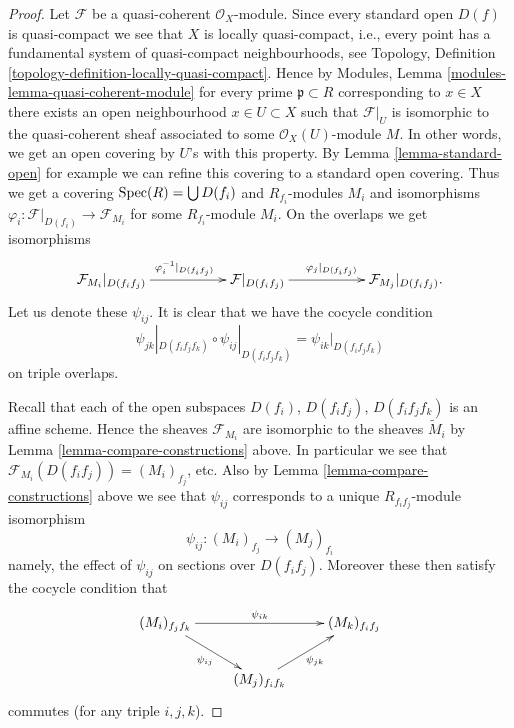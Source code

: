 \begin{proof}
Let $\mathcal{F}$ be a quasi-coherent $\mathcal{O}_X$-module.
Since every standard open $D(f)$ is quasi-compact we see that
$X$ is locally quasi-compact, i.e., every point has a fundamental
system of quasi-compact neighbourhoods, see Topology,
Definition \ref{topology-definition-locally-quasi-compact}.
Hence by Modules, Lemma \ref{modules-lemma-quasi-coherent-module}
for every prime $\mathfrak p \subset R$ corresponding to $x \in X$
there exists an open neighbourhood $x \in U \subset X$ such that
$\mathcal{F}|_U$ is isomorphic to the quasi-coherent
sheaf associated to some $\mathcal{O}_X(U)$-module $M$.
In other words, we get an open covering by $U$'s with this property.
By Lemma \ref{lemma-standard-open} for example we can refine this
covering to  a standard open covering.
Thus we get a covering $\mathop{\mathrm{Spec}}(R) = \bigcup D(f_i)$
and $R_{f_i}$-modules $M_i$ and isomorphisms
$\varphi_i : \mathcal{F}|_{D(f_i)} \to \mathcal{F}_{M_i}$
for some $R_{f_i}$-module $M_i$. On the overlaps
we get isomorphisms
$$
\xymatrix{
\mathcal{F}_{M_i}|_{D(f_if_j)}
\ar[rr]^{\varphi_i^{-1}|_{D(f_if_j)}}
& &
\mathcal{F}|_{D(f_if_j)}
\ar[rr]^{\varphi_j|_{D(f_if_j)}}
& &
\mathcal{F}_{M_j}|_{D(f_if_j)}.
}
$$
Let us denote these $\psi_{ij}$. It is clear that
we have the cocycle condition
$$
\psi_{jk}|_{D(f_if_jf_k)}
\circ
\psi_{ij}|_{D(f_if_jf_k)}
=
\psi_{ik}|_{D(f_if_jf_k)}
$$
on triple overlaps.

\medskip\noindent
Recall that each of the open subspaces $D(f_i)$, $D(f_if_j)$,
$D(f_if_jf_k)$ is an affine scheme. Hence the sheaves $\mathcal{F}_{M_i}$
are isomorphic to the sheaves $\widetilde M_i$ by Lemma
\ref{lemma-compare-constructions} above. In particular we see that
$\mathcal{F}_{M_i}(D(f_if_j)) = (M_i)_{f_j}$, etc.
Also by Lemma \ref{lemma-compare-constructions} above we see
that $\psi_{ij}$ corresponds to a unique $R_{f_if_j}$-module isomorphism
$$
\psi_{ij} : (M_i)_{f_j} \longrightarrow (M_j)_{f_i}
$$
namely, the effect of $\psi_{ij}$ on sections over $D(f_if_j)$.
Moreover these then satisfy the cocycle condition that
$$
\xymatrix{
(M_i)_{f_jf_k}
\ar[rd]_{\psi_{ij}}
\ar[rr]^{\psi_{ik}}
& &
(M_k)_{f_if_j} \\
&
(M_j)_{f_if_k} \ar[ru]_{\psi_{jk}}
}
$$
commutes (for any triple $i, j, k$).


\end{proof}
